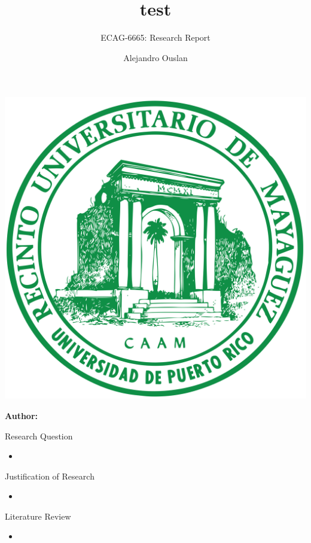 \documentclass[12pt]{beamer}
\title[]{test}
\subtitle{ECAG-6665: Research Report}
\author[Name Surname]{Alejandro Ouslan}
\institute[institute]{University of Puerto Rico}
\date{} %
\begin{document}
\begin{frame}{}
	\vspace{\fill}

	\includegraphics[width=0.16\linewidth]{../../assets/uprm_logo.png}

	\vspace{\fill}

	\Large
	\color{main}
	\inserttitle

	\medskip

	\large
	\color{black}
	\insertsubtitle

	\vspace{\fill}

	\footnotesize
	\insertinstitute

	\vspace{\fill}

	\textbf{Author:} \insertauthor

	\medskip

	\insertdate

	\vspace{\fill}
\end{frame}

\begin{frame}[allowframebreaks]{Research Question}
	\begin{itemize}
		\item \cite{ashenfelter2022minimum}
	\end{itemize}

\end{frame}

\begin{frame}[allowframebreaks]{Justification of Research}
	\begin{itemize}
		\item
	\end{itemize}

\end{frame}

\begin{frame}[allowframebreaks]{Literature Review}
	\begin{itemize}
		\item
	\end{itemize}

\end{frame}
\end{document}
